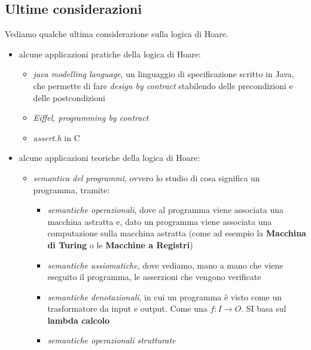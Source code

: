 				      					      			\subsection{Ultime considerazioni}
				      					      			Vediamo qualche ultima considerazione sulla logica di Hoare.
				      					      			\begin{itemize}
				      					      				\item alcune applicazioni pratiche della logica di Hoare:
				      					      				      \begin{itemize}
				      					      				      	\item \textit{java modelling language}, un linguaggio di specificazione
				      					      				      	      scritto in Java, che permette di fare \textit{design by contract} stabilendo
				      					      				      	      delle precondizioni e delle postcondizioni 
				      					      				      	\item \textit{Eiffel, programming by contract}
				      					      				      	\item \textit{assert.h} in C
				      					      				      \end{itemize}
				      					      				      				      					      				        
				      					      				\item alcune applicazioni teoriche della logica di Hoare:
				      					      				      \begin{itemize}
				      					      				      	\item \textit{semantica del programmi}, ovvero lo studio di cosa significa
				      					      				      	      un programma, tramite:
				      					      				      	      \begin{itemize}
				      					      				      	      	\item \textit{semantiche operazionali}, dove al programma
				      					      				      	      	      viene associata una macchina astratta e, dato un programma viene associata
				      					      				      	      	      una computazione sulla macchina astratta (come ad esempio la
				      					      				      	      	      \textbf{Macchina di Turing} o le \textbf{Macchine a Registri})
				      					      				      	      	\item \textit{semantiche assiomatiche}, dove vediamo, mano a mano che
				      					      				      	      	      viene eseguito il programma, le asserzioni che vengono verificate
				      					      				      	      	\item \textit{semantiche denotazionali}, in cui un programma è visto come
				      					      				      	      	      un trasformatore da input e output. Come una $f:I\to O$. SI basa sul
				      					      				      	      	      \textbf{lambda calcolo}
				      					      				      	      	\item \textit{semantiche operazionali strutturate}
				      					      				      	      \end{itemize}
				      					      				      \end{itemize}
				      					      			\end{itemize}
